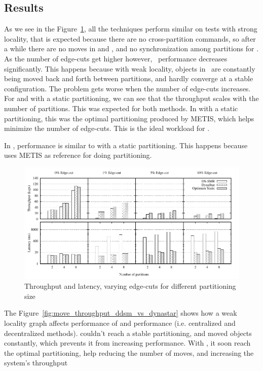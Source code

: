\subsection{Results}
As we see in the Figure~\ref{fig:varying_edge_cut}, all the techniques perform similar on tests with strong locality, that is
expected because there are no cross-partition commands, so after a while there are no moves in \dynastar and \dssmr, and no synchronization among partitions for \ssmr.
As the number of edge-cuts get higher however, \dssmr\ performance decreases significantly.
This happens because with weak locality, objects in \dssmr\ are constantly being moved back and forth between partitions,
and hardly converge at a stable configuration. The problem gets worse when the number of edge-cuts increases.
For \dynastar and \ssmr with a static partitioning, we can see that the throughput scales 
with the number of partitions. This was expected for both methods. In \ssmr with a static partitioning, this was the optimal partitioning produced by METIS, which helps minimize the number of edge-cuts. This is the ideal workload for \ssmr{}.

In \dynastar, performance is similar to \ssmr with a static partitioning. This happens because \dynastar uses METIS as 
reference for doing partitioning. 

\begin{figure}[t]
	\includegraphics{figures/experiments/throughput-latency-avg-all}
	\caption{Throughput and latency, varying edge-cuts for different partitioning size}
	\label{fig:varying_edge_cut}
\end{figure}

The Figure~\ref{fig:move_throughput_ddsm_vs_dynastar} shows how a weak locality graph affects performance of \dssmr and \dynastar performance (i.e. centralized and decentralized methods). \dssmr couldn't reach a stable partitioning, and moved objects constantly, which prevents it from increasing performance. With \dynastar{}, it soon reach the optimal partitioning, help reducing the number of moves, and increasing the system's throughput


